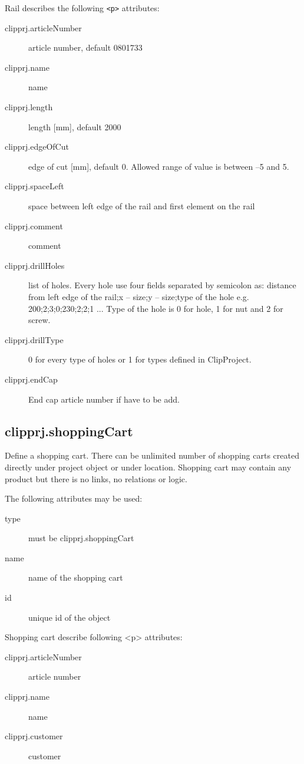 \documentclass[%
	a4paper,
	oneside,
	listof=numbered,
	parskip=half,
	headsepline=true,
	footsepline=true,
	]{scrbook}
\begin{document}
Rail describes the following \verb|<p>| attributes: 

\begin{description}
	\item[clipprj.articleNumber] article number, default 0801733 
	\item[clipprj.name] name 
	\item[clipprj.length] length [mm], default 2000 
	\item[clipprj.edgeOfCut] edge of cut [mm], default 0. Allowed range of value is between –5 and 5. 
	\item[clipprj.spaceLeft] space between left edge of the rail and first element on the rail 
	\item[clipprj.comment] comment 
	\item[clipprj.drillHoles] list of holes. Every hole use four fields separated by semicolon as: distance from left edge of the rail;x – size;y – size;type of the hole e.g. 200;2;3;0;230;2;2;1 ... Type of the hole is 0 for hole, 1 for nut and 2 for screw. 
	\item[clipprj.drillType] 0 for every type of holes or 1 for types defined in ClipProject. 
	\item[clipprj.endCap] End cap article number if have to be add. 
\end{description}

\subsection{clipprj.shoppingCart} 

Define a shopping cart. There can be unlimited number of shopping carts created directly under project object or under location. Shopping cart may contain any product but there is no links, no relations or logic.

The following attributes may be used:

\begin{description}
	\item[type] must be clipprj.shoppingCart
	\item[name] name of the shopping cart
	\item[id] unique id of the object
\end{description}

Shopping cart describe following <p> attributes: 

\begin{description}
	\item[clipprj.articleNumber] article number 
	\item[clipprj.name] name 
	\item[clipprj.customer] customer 
\end{description}
 
\end{document}
